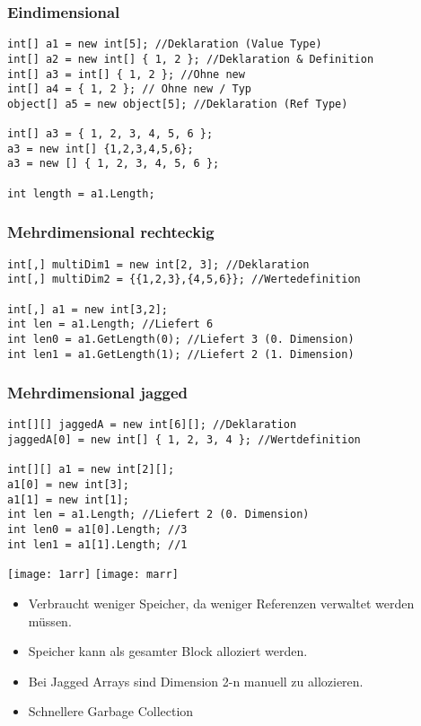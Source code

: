 \begin{multicols*}{2}
\subsubsection{Eindimensional}
\begin{lstlisting}
int[] a1 = new int[5]; //Deklaration (Value Type)
int[] a2 = new int[] { 1, 2 }; //Deklaration & Definition
int[] a3 = int[] { 1, 2 }; //Ohne new
int[] a4 = { 1, 2 }; // Ohne new / Typ
object[] a5 = new object[5]; //Deklaration (Ref Type)

int[] a3 = { 1, 2, 3, 4, 5, 6 }; 
a3 = new int[] {1,2,3,4,5,6}; 
a3 = new [] { 1, 2, 3, 4, 5, 6 };

int length = a1.Length;
\end{lstlisting}
\subsubsection{Mehrdimensional rechteckig}
\begin{lstlisting}
int[,] multiDim1 = new int[2, 3]; //Deklaration
int[,] multiDim2 = {{1,2,3},{4,5,6}}; //Wertedefinition

int[,] a1 = new int[3,2];
int len = a1.Length; //Liefert 6
int len0 = a1.GetLength(0); //Liefert 3 (0. Dimension)
int len1 = a1.GetLength(1); //Liefert 2 (1. Dimension)
\end{lstlisting}
\subsubsection{Mehrdimensional jagged}
\begin{lstlisting}
int[][] jaggedA = new int[6][]; //Deklaration
jaggedA[0] = new int[] { 1, 2, 3, 4 }; //Wertdefinition

int[][] a1 = new int[2][]; 
a1[0] = new int[3]; 
a1[1] = new int[1];
int len = a1.Length; //Liefert 2 (0. Dimension)
int len0 = a1[0].Length; //3
int len1 = a1[1].Length; //1
\end{lstlisting}
\texttt{[image: 1arr]}
\vrule
\texttt{[image: marr]}
\begin{itemize}
    \item Verbraucht weniger Speicher, da weniger Referenzen verwaltet werden müssen.
    \item Speicher kann als gesamter Block alloziert werden.
    \item Bei Jagged Arrays sind Dimension 2-n manuell zu allozieren.
    \item Schnellere Garbage Collection
\end{itemize}


\end{multicols*}

